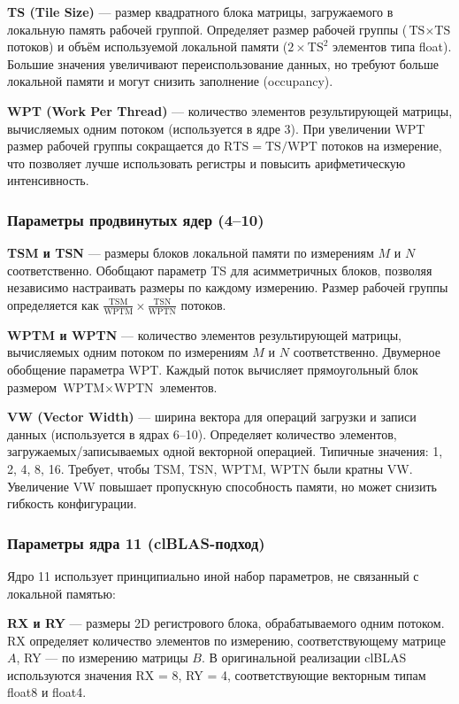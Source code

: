 \textbf{TS (Tile Size)} --- размер квадратного блока матрицы, загружаемого в локальную память рабочей группой. Определяет размер рабочей группы ($\text{TS} \times \text{TS}$ потоков) и объём используемой локальной памяти ($2 \times \text{TS}^2$ элементов типа float). Большие значения увеличивают переиспользование данных, но требуют больше локальной памяти и могут снизить заполнение (occupancy).

\textbf{WPT (Work Per Thread)} --- количество элементов результирующей матрицы, вычисляемых одним потоком (используется в ядре 3). При увеличении WPT размер рабочей группы сокращается до $\text{RTS} = \text{TS}/\text{WPT}$ потоков на измерение, что позволяет лучше использовать регистры и повысить арифметическую интенсивность.

\subsubsection{Параметры продвинутых ядер (4--10)}

\textbf{TSM и TSN} --- размеры блоков локальной памяти по измерениям $M$ и $N$ соответственно. Обобщают параметр TS для асимметричных блоков, позволяя независимо настраивать размеры по каждому измерению. Размер рабочей группы определяется как $\frac{\text{TSM}}{\text{WPTM}} \times \frac{\text{TSN}}{\text{WPTN}}$ потоков.

\textbf{WPTM и WPTN} --- количество элементов результирующей матрицы, вычисляемых одним потоком по измерениям $M$ и $N$ соответственно. Двумерное обобщение параметра WPT. Каждый поток вычисляет прямоугольный блок размером $\text{WPTM} \times \text{WPTN}$ элементов.

\textbf{VW (Vector Width)} --- ширина вектора для операций загрузки и записи данных (используется в ядрах 6--10). Определяет количество элементов, загружаемых/записываемых одной векторной операцией. Типичные значения: 1, 2, 4, 8, 16. Требует, чтобы TSM, TSN, WPTM, WPTN были кратны VW. Увеличение VW повышает пропускную способность памяти, но может снизить гибкость конфигурации.

\subsubsection{Параметры ядра 11 (clBLAS-подход)}

Ядро 11 использует принципиально иной набор параметров, не связанный с локальной памятью:

\textbf{RX и RY} --- размеры 2D регистрового блока, обрабатываемого одним потоком. RX определяет количество элементов по измерению, соответствующему матрице $A$, RY --- по измерению матрицы $B$. В оригинальной реализации clBLAS используются значения RX = 8, RY = 4, соответствующие векторным типам float8 и float4.


